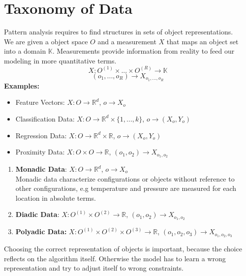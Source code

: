 \documentclass[twoside]{article}
\begin{document}
\newpage

\section{Taxonomy of Data}

Pattern analysis requires to find structures in sets of object representations.\\
We are given a object space $O$ and a measurement $X$ that maps an object set into a domain $\mathbb{K}$. Measurements provide information from reality to feed our modeling in more quantitative terms.
\begin{equation*}
    X : O^{(1)} \times ... \times O^{(R)} \rightarrow \mathbb{K}
\end{equation*}
\begin{equation*}
    (o_1,...,o_R) \rightarrow X_{o_1,...,o_R}
\end{equation*}
\textbf{Examples:}
\begin{itemize}
    \item Feature Vectors: $X : O \rightarrow \mathbb{R}^d$, $o \rightarrow X _o$
    \item Classification Data: $X : O \rightarrow \mathbb{R}^d \times \{1,...,k\} $, $o \rightarrow (X _o, Y_o)$
    \item Regression Data: $X : O \rightarrow \mathbb{R}^d \times \mathbb{R}$, $o \rightarrow (X _o, Y_o)$
    \item Proximity Data: $X: O \times O \rightarrow \mathbb{R}$, $(o_1,o_2) \rightarrow X_{o_1,o_2}$
\end{itemize}
\renewcommand{\theenumi}{\alph{enumi}}
\begin{enumerate}
    \item \textbf{Monadic Data}: $X : O \rightarrow \mathbb{R}^d$, $o \rightarrow X _o$
    \\Monadic data characterize configurations or objects without reference to other configurations, e.g temperature and pressure are measured for each location in absolute terms.
    \item \textbf{Diadic Data}: $X: O^{(1)} \times O^{(2)} \rightarrow \mathbb{R}$, $(o_1,o_2) \rightarrow X_{o_1,o_2}$
    \item \textbf{Polyadic Data:} $X: O^{(1)} \times O^{(2)} \times O^{(3)} \rightarrow \mathbb{R}$, $(o_1,o_2,o_3) \rightarrow X_{o_1,o_2,o_3}$
\end{enumerate}
Choosing the correct representation of objects is important, because the choice reflects on the algorithm itself. Otherwise the model has to learn a wrong representation and try to adjust itself to wrong constraints.
\end{document}
